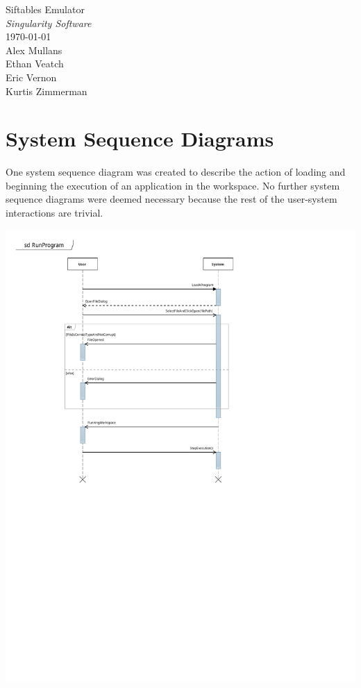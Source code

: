 \documentclass[12pt]{article}
\begin{document}
\vspace*{\fill}
        \begin{center}
                \LARGE{Siftables Emulator} \\
                \LARGE{\textit{Singularity Software}} \\
                \vspace{.15in}
                \large{\today} \\
                \vspace{4in}
                        Alex Mullans \\
                        Ethan Veatch \\
                        Eric Vernon \\
                        Kurtis Zimmerman
        \end{center}
\vspace*{\fill}
\thispagestyle{empty}

\section{System Sequence Diagrams}
One system sequence diagram was created to describe the action of loading and beginning the execution of an application in the workspace.  No further system sequence diagrams were deemed necessary because the rest of the user-system interactions are trivial.
\begin{center}
        \includegraphics[scale=.75]{./pdfs/Models/SSD - RunProgram.pdf}
\end{center}
\end{document}
